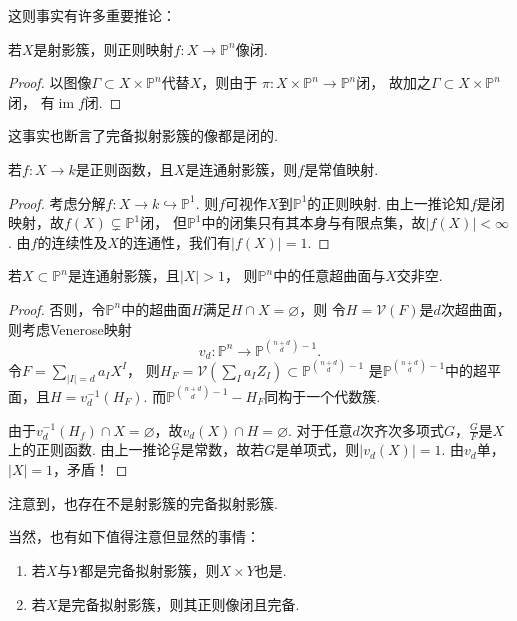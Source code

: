     这则事实有许多重要推论：

    \begin{corollary}
        若$X$是射影簇，则正则映射$f\colon X \rightarrow \mathbb{P}^{n}$像闭.
    \end{corollary}
    \begin{proof}
        以图像$\Gamma \subset X \times \mathbb{P}^{n}$代替$X$，则由于
        $\pi\colon X \times \mathbb{P}^{n} \rightarrow \mathbb{P}^{n}$闭，
        故加之$\Gamma \subset X \times \mathbb{P}^{n}$闭，
        有$\operatorname{im}f$闭.
    \end{proof}

    \begin{remark}
        这事实也断言了完备拟射影簇的像都是闭的.
    \end{remark}

    \begin{corollary}
        若$f\colon X \rightarrow k$是正则函数，且$X$是连通射影簇，则$f$是常值映射.
    \end{corollary}
    \begin{proof}
        考虑分解$f\colon X \rightarrow k \hookrightarrow \mathbb{P}^{1}$.
        则$f$可视作$X$到$\mathbb{P}^{1}$的正则映射.
        由上一推论知$f$是闭映射，故$f(X) \subsetneq \mathbb{P}^{1}$闭，
        但$\mathbb{P}^{1}$中的闭集只有其本身与有限点集，故$|f(X)|<\infty$.
        由$f$的连续性及$X$的连通性，我们有$|f(X)|=1$.
    \end{proof}
    
    \begin{corollary}
        若$X \subset \mathbb{P}^{n}$是连通射影簇，且$|X|>1$，
        则$\mathbb{P}^{n}$中的任意超曲面与$X$交非空.
    \end{corollary}
    \begin{proof}
        否则，令$\mathbb{P}^{n}$中的超曲面$H$满足$H \cap X = \varnothing$，则
        令$H=\mathcal{V}(F)$是$d$次超曲面，则考虑Venerose映射
        \[v_{d}\colon\mathbb{P}^{n} \rightarrow \mathbb{P}^{{n+d \choose d}-1}.\]
        令$F=\sum_{|I|=d}a_{I}X^{I}$，
        则$H_{F}=\mathcal{V}(\sum_{I}a_{I}Z_{I}) \subset \mathbb{P}^{{n+d \choose d}-1}$
        是$\mathbb{P}^{{n+d \choose d}-1}$中的超平面，且$H=v_{d}^{-1}(H_{F})$. 
        而$\mathbb{P}^{{n+d \choose d}-1}-H_{F}$同构于一个代数簇.

        由于$v_{d}^{-1}(H_{f}) \cap X = \varnothing$，故$v_{d}(X) \cap H = \varnothing$.
        对于任意$d$次齐次多项式$G$，$\frac{G}{F}$是$X$上的正则函数. 
        由上一推论$\frac{G}{F}$是常数，故若$G$是单项式，则$|v_{d}(X)|=1$. 
        由$v_{d}$单，$|X|=1$，矛盾！
    \end{proof}

    \begin{remark}
        注意到，也存在不是射影簇的完备拟射影簇.
    \end{remark}

    当然，也有如下值得注意但显然的事情：
    \begin{proposition}
        \begin{enumerate}
            \item[(1)] 若$X$与$Y$都是完备拟射影簇，则$X \times Y$也是. 
            \item[(2)] 若$X$是完备拟射影簇，则其正则像闭且完备.
        \end{enumerate}
    \end{proposition}